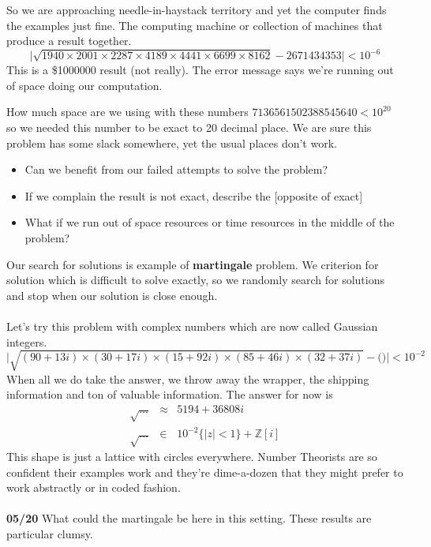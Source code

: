 \documentclass[12pt]{article}
\begin{document}
{\begin{verbatim}
\end{verbatim}
So we are approaching needle-in-haystack territory and yet the computer finds the examples just fine.  The computing machine or collection of machines that produce a result together.
$$ \Big| \sqrt{ 1940 \times 2001 \times 2287 \times 4189 \times 4441 \times 6699 \times 8162 } - 2671434353 \Big| < 10^{-6} $$
This is a \$1000000 result (not really).  The error message says we're running out of space doing our computation. 

\newpage 

How much space are we using with these numbers $713 6561 5023 8854 5640 < 10^{20}$ so we needed this number to be exact to 20 decimal place.  We are sure this problem has some slack somewhere, yet the usual places don't work.  
\begin{itemize}
\item Can we benefit from our failed attempts to solve the problem?
\item If we complain the result is not exact, describe the [opposite of exact]
\item What if we run out of space resources or time resources in the middle of the problem?
\end{itemize}
Our search for solutions is example of \textbf{martingale} problem.  We criterion for solution which is difficult to solve exactly, so we randomly search for solutions and stop when our solution is close enough. \\ \\
Let's try this problem with complex numbers which are now called Gaussian integers.  
$$ \Big| \sqrt{(90 + 13i) \times (30 + 17i) \times (15 +92i) \times (85 + 46i) \times (32 + 37i)} - \big(  \big) \Big| < 10^{-2}  $$
When all we do take the answer, we throw away the wrapper, the shipping information and ton of valuable information.  The answer for now is 
\begin{eqnarray*} \sqrt{\dots} &\approx& 5194 + 36808i \\
\sqrt{\dots} & \in & 10^{-2} \{ |z| < 1 \} + \mathbb{Z}[i] 
\end{eqnarray*}
This shape is just a lattice with circles everywhere.  Number Theorists are so confident their examples work and they're dime-a-dozen that they might prefer to work abstractly or in coded fashion. \\ \\
\textbf{05/20} What could the martingale be here in this setting.  These results are particular clumsy. \\ \\
}
\end{document}
